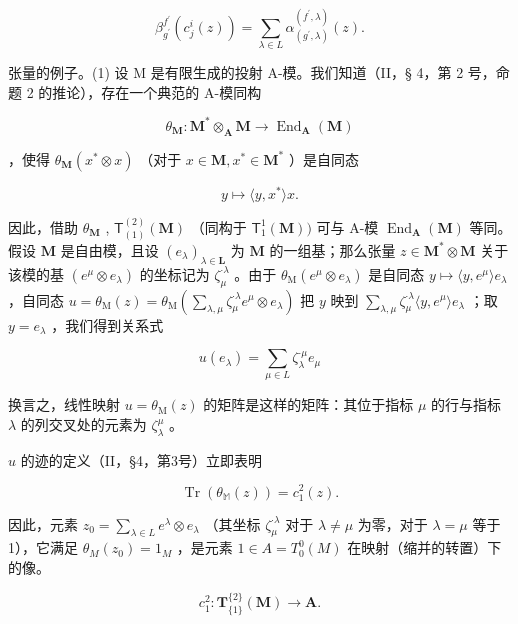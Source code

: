 \[
\beta_ {g ^ {\prime}} ^ {f ^ {\prime}} (c _ {j} ^ {i} (z)) = \sum_ {\lambda \in L} \alpha_ {(g ^ {\prime}, \lambda)} ^ {(f ^ {\prime}, \lambda)} (z).\tag{17}
\]

张量的例子。(1) 设 M 是有限生成的投射 A-模。我们知道（II，§ 4，第 2 号，命题 2 的推论），存在一个典范的 A-模同构

\[
\theta_ {\mathbf {M}} \colon \mathbf {M} ^ {*} \otimes_ {\mathbf {A}} \mathbf {M} \rightarrow \operatorname{End} _ {\mathbf {A}} (\mathbf {M})
\]

，使得 \(\theta_{\mathbf{M}}(x^{*}\otimes x)\) （对于 \(x\in \mathbf{M},x^{*}\in \mathbf{M}^{*}\) ）是自同态

\[
y \mapsto \langle y, x ^ {*} \rangle x.
\]

因此，借助 \(\theta_{\mathbf{M}}\) , \(\mathsf{T}_{(1)}^{(2)}(\mathbf{M})\) （同构于 \(\mathsf{T}_1^1 (\mathbf{M}))\) 可与 A-模 \(\operatorname{End}_{\mathbf{A}}(\mathbf{M})\) 等同。假设 \(\mathbf{M}\) 是自由模，且设 \((e_{\lambda})_{\lambda \in \mathbf{L}}\) 为 \(\mathbf{M}\) 的一组基；那么张量 \(z\in \mathbf{M}^*\otimes \mathbf{M}\) 关于该模的基 \((e^{\mu}\otimes e_{\lambda})\) 的坐标记为 \(\zeta_{\mu}^{\cdot \lambda}\) 。由于 \(\theta_{\mathrm{M}}(e^{\mu}\otimes e_{\lambda})\) 是自同态 \(y\mapsto \langle y,e^{\mu}\rangle e_{\lambda}\) ，自同态 \(u = \theta_{\mathrm{M}}(z) = \theta_{\mathrm{M}}\left(\sum_{\lambda ,\mu}\zeta_{\mu}^{\cdot \lambda}e^{\mu}\otimes e_{\lambda}\right)\) 把 \(y\) 映到 \(\sum_{\lambda ,\mu}\zeta_{\mu}^{\cdot \lambda}\langle y,e^{\mu}\rangle e_{\lambda}\) ；取 \(y = e_{\lambda}\) ，我们得到关系式

\[
u (e _ {\lambda}) = \sum_ {\mu \in L} \zeta_ {\lambda} ^ {\cdot \mu} e _ {\mu}\tag{18}
\]

换言之，线性映射 \(u = \theta_{\mathrm{M}}(z)\) 的矩阵是这样的矩阵：其位于指标 \(\mu\) 的行与指标 \(\lambda\) 的列交叉处的元素为 \(\zeta_{\lambda}^{\mu}\) 。

\(u\) 的迹的定义（II，§4，第3号）立即表明

\[
\operatorname{Tr} (\theta_ {\mathbb {M}} (z)) = c _ {1} ^ {2} (z).
\]

因此，元素 \(z_0 = \sum_{\lambda \in L} e^\lambda \otimes e_\lambda\) （其坐标 \(\zeta_\mu^{\cdot \lambda}\) 对于 \(\lambda \neq \mu\) 为零，对于 \(\lambda = \mu\) 等于1），它满足 \(\theta_M(z_0) = 1_M\) ，是元素 \(1 \in A = T_0^0(M)\) 在映射（缩并的转置）下的像。

\[
c _ {1} ^ {2}: \mathbf {T} _ {\{1 \}} ^ {\{2 \}} (\mathbf {M}) \rightarrow \mathbf {A}.
\]


